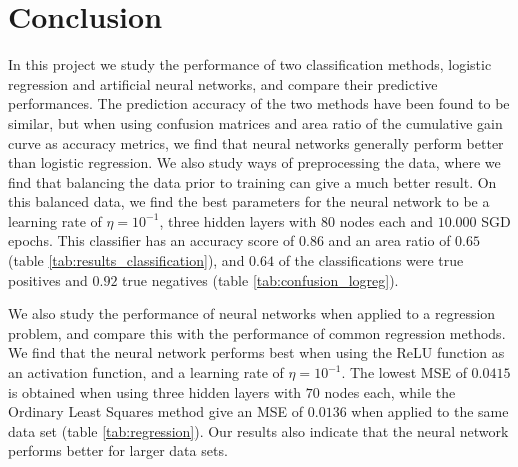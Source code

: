 \section{Conclusion}\label{sec:Conclusion}
In this project we study the performance of two classification methods, logistic regression and artificial neural networks, and compare their predictive performances. The prediction accuracy of the two methods have been found to be similar, but when using confusion matrices and area ratio of the cumulative gain curve as accuracy metrics, we find that neural networks generally perform better than logistic regression. We also study ways of preprocessing the data, where we find that balancing the data prior to training can give a much better result. On this balanced data, we find the best parameters for the neural network to be a learning rate of $\eta=10^{-1}$, three hidden layers with $80$ nodes each and $10.000$ SGD epochs. This classifier has an accuracy score of $0.86$ and an area ratio of $0.65$ (table \ref{tab:results_classification}), and $0.64$ of the classifications were true positives and $0.92$ true negatives (table \ref{tab:confusion_logreg}). 

We also study the performance of neural networks when applied to a regression problem, and compare this with the performance of common regression methods. We find that the neural network performs best when using the ReLU function as an activation function, and a learning rate of $\eta=10^{-1}$. The lowest MSE of $0.0415$ is obtained when using three hidden layers with $70$ nodes each, while the Ordinary Least Squares method give an MSE of $0.0136$ when applied to the same data set (table \ref{tab:regression}). Our results also indicate that the neural network performs better for larger data sets.